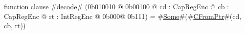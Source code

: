 function clause #\hyperref[zdecode]{decode}# (0b010010 @ 0b00100 @ cd : CapRegEnc @ cb : CapRegEnc @ rt : IntRegEnc @ 0b000@ 0b111) = #\hyperref[zSome]{Some}#(#\hyperref[zCFromPtr]{CFromPtr}#(cd, cb, rt))
